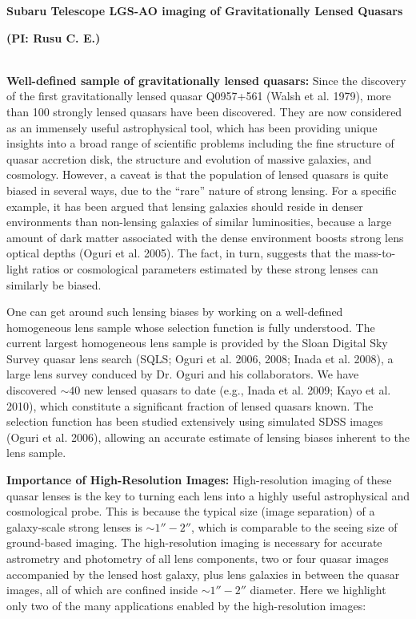 \documentclass[a4paper,11pt]{article}
\begin{document}
\begin {centering}
{\bf Subaru Telescope LGS-AO imaging of Gravitationally Lensed Quasars}\\
 \end{centering}
 
\begin {centering}
  {\bf (PI:
  Rusu C. E.)}\\\
  \end{centering}
 

{\bf Well-defined sample of gravitationally lensed quasars:} 
Since the discovery of the first gravitationally lensed quasar
Q0957+561 (Walsh et al. 1979), more than 100 strongly lensed quasars
have been discovered. They are now considered as an immensely useful astrophysical
tool, which has been providing unique insights into a broad range of
scientific problems including the fine structure of quasar accretion
disk, the structure and evolution of massive galaxies, and cosmology. 
However, a caveat is that the population of lensed quasars is quite
biased in several ways, due to the ``rare'' nature of strong lensing.
For a specific example, it has been argued that lensing galaxies should
reside in denser environments than non-lensing galaxies of similar
luminosities, because a large amount of dark matter associated with
the dense environment boosts strong lens optical depths (Oguri et
al. 2005). The fact, in turn, suggests that the mass-to-light ratios or
cosmological parameters estimated by these strong lenses can similarly
be biased. 

One can get around such lensing biases by working on a well-defined
homogeneous lens sample whose selection function is fully understood.
The current largest homogeneous lens sample is provided by the Sloan
Digital Sky Survey quasar lens search (SQLS; Oguri et al. 2006, 2008;
Inada et al. 2008), a large lens survey conduced by Dr. Oguri and his collaborators. We have discovered $\sim 40$ new
lensed quasars to date (e.g., Inada et al. 2009; Kayo et al. 2010),
which constitute a significant fraction of lensed quasars known. 
The selection function has been studied extensively using simulated
SDSS images (Oguri et al. 2006), allowing an accurate estimate of
lensing biases inherent to the lens sample. 

{\bf Importance of High-Resolution Images:}  
High-resolution imaging of these quasar lenses is the key to turning each
lens into a highly useful astrophysical and cosmological probe. This
is because the typical size (image separation) of a galaxy-scale strong
lenses is $\sim 1''-2''$, which is comparable to the seeing size
of ground-based imaging. The high-resolution imaging is necessary for
accurate astrometry and photometry of all lens components, two or four
quasar images accompanied by the lensed host galaxy, plus lens
galaxies in between the quasar images, all of which are confined
inside $\sim 1''-2''$ diameter. Here we highlight only two of the
many applications enabled by the high-resolution images: 
\end{document}
